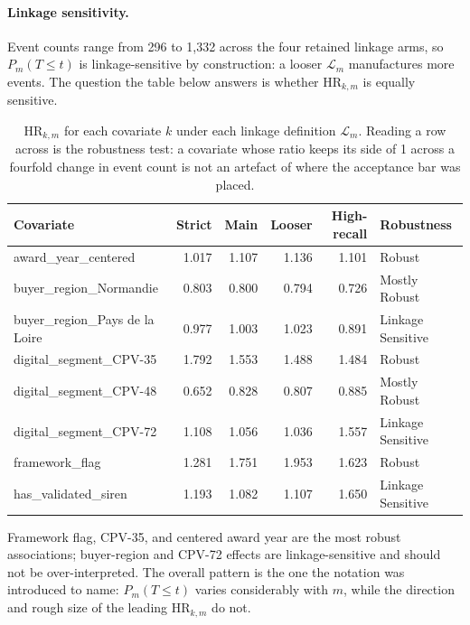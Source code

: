 \documentclass[11pt,a4paper]{article}
\begin{document}
\paragraph{Linkage sensitivity.} Event counts range from
296 to
1,332 across the four retained
linkage arms, so \(P_m(T\le t)\) is linkage-sensitive by construction: a looser
\(\mathcal{L}_m\) manufactures more events. The question the table below
answers is whether \(\mathrm{HR}_{k,m}\) is equally sensitive.
\begin{table}[H]
\centering
\small
\begin{tabularx}{\textwidth}{lrrrrl}
\toprule
Covariate & Strict & Main & Looser & High-recall & Robustness \\
\midrule
award\_year\_centered & 1.017 & 1.107 & 1.136 & 1.101 & Robust \\
buyer\_region\_Normandie & 0.803 & 0.800 & 0.794 & 0.726 & Mostly Robust \\
buyer\_region\_Pays de la Loire & 0.977 & 1.003 & 1.023 & 0.891 & Linkage Sensitive \\
digital\_segment\_CPV-35 & 1.792 & 1.553 & 1.488 & 1.484 & Robust \\
digital\_segment\_CPV-48 & 0.652 & 0.828 & 0.807 & 0.885 & Mostly Robust \\
digital\_segment\_CPV-72 & 1.108 & 1.056 & 1.036 & 1.557 & Linkage Sensitive \\
framework\_flag & 1.281 & 1.751 & 1.953 & 1.623 & Robust \\
has\_validated\_siren & 1.193 & 1.082 & 1.107 & 1.650 & Linkage Sensitive \\
\bottomrule
\end{tabularx}
\caption{\(\mathrm{HR}_{k,m}\) for each covariate \(k\) under each linkage
definition \(\mathcal{L}_m\). Reading a row across is the robustness test: a
covariate whose ratio keeps its side of 1 across a fourfold change in event
count is not an artefact of where the acceptance bar was placed.}
\end{table}
Framework flag, CPV-35, and centered award year are the most robust
associations; buyer-region and CPV-72 effects are linkage-sensitive and should
not be over-interpreted. The overall pattern is the one the notation was
introduced to name: \(P_m(T\le t)\) varies considerably with \(m\), while the
direction and rough size of the leading \(\mathrm{HR}_{k,m}\) do not.
\end{document}

